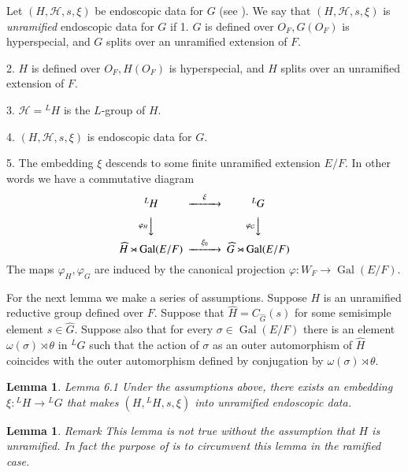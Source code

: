 \documentclass[11pt]{amsart}
\theoremstyle{plain}
\newtheorem{lemma}[theorem]{Lemma}
\theoremstyle{definition}
\def\Gal{\operatorname{\text{Gal}}}          %
\def\LANGLANDSO{21}
\def\LANGLANDSCAN{20}
\begin{document}
Let $(H,\mathcal{ H},s,\xi)$ be endoscopic data for $G$
(see \cite{\LANGLANDSO}).  
We say that $(H,\mathcal{ H},s,\xi)$ is {\it unramified }
endoscopic data for $G$ if 
{1.}  $G$ is defined over $O_F,G(O_F)$ is hyperspecial,
and $G$ splits over an unramified extension of $F$.

{2.}  $H$ is defined over $O_F,H(O_F)$ is hyperspecial,
and $H$ splits over an unramified extension of $F$.

{3.}  $\mathcal{ H}={}^LH$ is the $L$-group of $H$.

{4.}  $(H,\mathcal{ H},s,\xi)$ is endoscopic data for $G$.

{5.}  The embedding $\xi$ descends to some finite unramified
extension $E/F$.  
In other words we have a commutative diagram
$$
\CD
{}^LH @>\xi>> {}^LG\\
@V\varphi_H VV    @V\varphi_GVV\\
\widehat H\rtimes\Gal(E/F) @>{\xi_0}>> 
\widehat G\rtimes \Gal(E/F)
\endCD
$$
The maps $\varphi_H,\varphi_G$ are induced by the canonical projection
$\varphi:W_F\to \Gal(E/F)$.

For the next lemma we make a series of assumptions.
Suppose $H$ is an unramified reductive group defined over $F$.
Suppose that 
$\widehat H=C_{\widehat G}(s)$ for some semisimple element
$s\in\widehat G$.  Suppose also that for every $\sigma\in \Gal(E/F)$ there
is an element $\omega(\sigma)\rtimes\theta$ in ${}^LG$ such that the action
of $\sigma$ as an outer automorphism of $\widehat H$ coincides with the
outer automorphism defined by conjugation by $\omega(\sigma)\rtimes\theta$.

\begin{lemma}{Lemma 6.1}  Under the assumptions above, there exists an embedding
$\xi:{}^LH\to{}^LG$ that makes $(H,{}^LH,s,\xi)$ into
unramified endoscopic data.
\end{lemma}

\begin{lemma}{Remark}  This lemma is not true without the assumption that $H$ is
unramified.  In fact the purpose of \cite{\LANGLANDSCAN} is to circumvent
this lemma in the ramified case.
\end{lemma}
\end{document}
